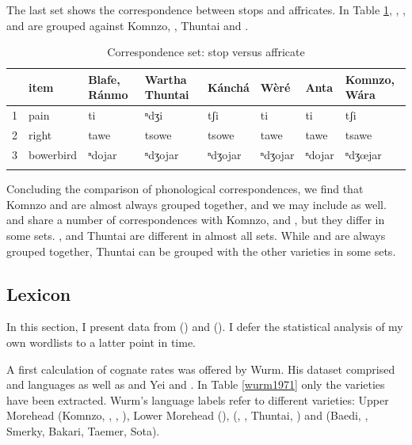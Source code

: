 The last set shows the correspondence between stops and affricates. In Table \ref{affrstop}, , ,  and  are grouped against Komnzo, ,  Thuntai and .

\begin{table}
\caption{Correspondence set: stop versus affricate}
\label{affrstop}
	\begin{tabularx}{\textwidth}{lllXllll}
		\lsptoprule
		&{item} &Blafe, Ránmo &Wartha Thuntai &Kánchá &Wèré &Anta &Komnzo, Wára\\\midrule
		1 &{pain} &ti &ⁿdʒi &tʃi &ti &ti &tʃi\\
		2 &{right} &tawe &tsowe &tsowe &tawe &tawe &tsawe\\
		3 &{bowerbird} &ⁿdojar &ⁿdʒojar &ⁿdʒojar &ⁿdʒojar &ⁿdojar &ⁿdʒœjar\\
		\lspbottomrule
	\end{tabularx}
\end{table}%

Concluding the comparison of phonological correspondences, we find that Komnzo and  are almost always grouped together, and we may include  as well.  and  share a number of correspondences with Komnzo,  and , but they differ in some sets. ,  and  Thuntai are different in almost all sets. While  and  are always grouped together,  Thuntai can be grouped with the other varieties in some sets.

\subsection{Lexicon}\label{comp-lex}

In this section, I present data from (\citealt{Wurm:1971uw}) and (\citealt{Clifton:1991fly}). I defer the statistical analysis of my own wordlists to a latter point in time.%

A first calculation of cognate rates was offered by Wurm. His dataset comprised  and  languages as well as and Yei and . In Table \ref{wurm1971} only the  varieties have been extracted. Wurm's language labels refer to different  varieties: Upper Morehead (Komnzo, , , ), Lower Morehead (),  (, ,  Thuntai, ) and  (Baedi, , Smerky, Bakari, Taemer, Sota).

